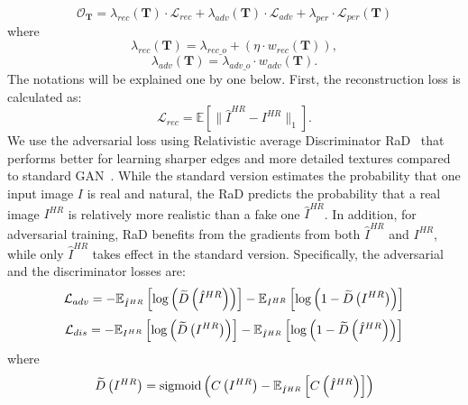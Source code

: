 \documentclass{article}
\begin{document}
\begin{equation}
\mathcal{O}_\mathbf{T}={\lambda}_{rec}(\mathbf{T})\cdot\mathcal{L}_{rec}+{\lambda}_{adv}(\mathbf{T})\cdot\mathcal{L}_{adv}+{\lambda}_{per}\cdot\mathcal{L}_{per}(\mathbf{T})
\end{equation}
where
\begin{equation}
{\lambda}_{rec}(\mathbf{T})={\lambda}_{rec\_o}+(\eta\cdot{w}_{rec}(\mathbf{T})),
\end{equation}
\begin{equation}
{\lambda}_{adv}(\mathbf{T})={\lambda}_{adv\_o}\cdot{w}_{adv}(\mathbf{T}).
\end{equation}
The notations will be explained one by one below.
First, the reconstruction loss is calculated as:
\begin{equation}
\mathcal{L}_{rec}=\mathbb{E}\left[\lVert\hat{I}^{HR}-{I}^{HR}\rVert_{1}\right].
\end{equation}
We use the adversarial loss using Relativistic average Discriminator RaD~\cite{Jolicoeur-Martineau19} that performs better for learning sharper edges and more detailed textures compared to standard GAN~\cite{goodfellow2014generative}. While the standard version estimates the probability that one input image $I$ is real and natural, the RaD predicts the probability that a real image ${I}^{HR}$ is relatively more realistic than a fake one $\hat{I}^{HR}$. In addition, for adversarial training, RaD benefits from the gradients from both $\hat{I}^{HR}$ and ${I}^{HR}$, while only $\hat{I}^{HR}$ takes effect in the standard version.
Specifically, the adversarial and the discriminator losses are:
\begin{equation}
\footnotesize
\mathcal{L}_{adv}=-\mathbb{E}_{\hat{I}^{HR}}\left [ \mathrm{log}\left ( \widetilde{D}\left (\hat{I}^{HR}\right ) \right ) \right ]-\mathbb{E}_{{I}^{HR}}\left [ \mathrm{log}\left (1- \widetilde{D}\left ( {I}^{HR} \right ) \right ) \right ]
\end{equation}
\begin{equation}
\footnotesize
\mathcal{L}_{dis}=-\mathbb{E}_{I^{HR}}\left [ \mathrm{log}\left ( \widetilde{D}\left ( I^{HR} \right ) \right ) \right ]-\mathbb{E}_{\hat{I}^{HR}}\left [ \mathrm{log}\left (1- \widetilde{D}\left (\hat{I}^{HR}\right ) \right ) \right ]
\end{equation}
where 
\begin{equation}
\footnotesize
\widetilde{D}\left ( I^{HR} \right ) = \mathrm{sigmoid} \left ( C\left (  I^{HR}\right ) -\mathbb{E}_{\hat{I}^{HR}}\left [ C\left (\hat{I}^{HR} \right )\right ] \right )
\end{equation}
\end{document}
